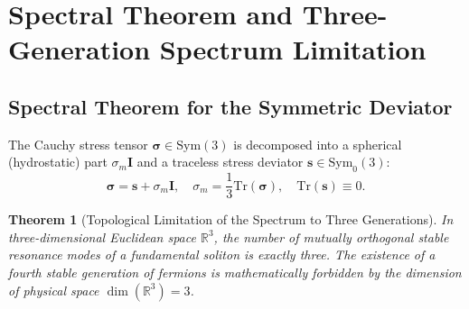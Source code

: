 \documentclass[12pt,a4paper]{article}
\newtheorem{theorem}{Theorem}
\begin{document}
	\section{Spectral Theorem and Three-Generation Spectrum Limitation}
	
	\subsection{Spectral Theorem for the Symmetric Deviator}
	The Cauchy stress tensor $\boldsymbol{\sigma} \in \mathrm{Sym}(3)$ is decomposed into a spherical (hydrostatic) part $\sigma_m \mathbf{I}$ and a traceless stress deviator $\mathbf{s} \in \mathrm{Sym}_0(3)$:
	\begin{equation}
		\boldsymbol{\sigma} = \mathbf{s} + \sigma_m \mathbf{I}, \quad \sigma_m = \frac{1}{3}\mathrm{Tr}(\boldsymbol{\sigma}), \quad \mathrm{Tr}(\mathbf{s}) \equiv 0.
	\end{equation}
	
	\begin{theorem}[Topological Limitation of the Spectrum to Three Generations]
		In three-dimensional Euclidean space $\mathbb{R}^3$, the number of mutually orthogonal stable resonance modes of a fundamental soliton is exactly three. The existence of a fourth stable generation of fermions is mathematically forbidden by the dimension of physical space $\dim(\mathbb{R}^3) = 3$.
	\end{theorem}
	
\end{document}
